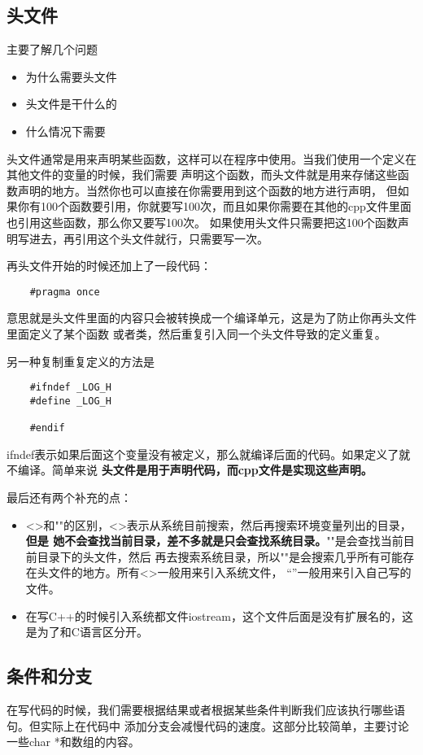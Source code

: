 \documentclass{article}
\begin{document}
\begin{sloppypar}
\subsection{头文件}
主要了解几个问题
\begin{itemize}
	\item 为什么需要头文件
	\item 头文件是干什么的
	\item 什么情况下需要
\end{itemize}

头文件通常是用来声明某些函数，这样可以在程序中使用。当我们使用一个定义在其他文件的变量的时候，我们需要
声明这个函数，而头文件就是用来存储这些函数声明的地方。当然你也可以直接在你需要用到这个函数的地方进行声明，
但如果你有100个函数要引用，你就要写100次，而且如果你需要在其他的cpp文件里面也引用这些函数，那么你又要写100次。
如果使用头文件只需要把这100个函数声明写进去，再引用这个头文件就行，只需要写一次。	

再头文件开始的时候还加上了一段代码：
\begin{lstlisting}
	#pragma once
\end{lstlisting}
意思就是头文件里面的内容只会被转换成一个编译单元，这是为了防止你再头文件里面定义了某个函数
或者类，然后重复引入同一个头文件导致的定义重复。	

另一种复制重复定义的方法是
\begin{lstlisting}
	#ifndef _LOG_H
	#define _LOG_H

	#endif
\end{lstlisting}
ifndef表示如果后面这个变量没有被定义，那么就编译后面的代码。如果定义了就不编译。简单来说
\textbf{头文件是用于声明代码，而cpp文件是实现这些声明。}

最后还有两个补充的点：
\begin{itemize}
	\item <>和""的区别，<>表示从系统目前搜索，然后再搜索环境变量列出的目录，\textbf{但是
	她不会查找当前目录，差不多就是只会查找系统目录。}""是会查找当前目前目录下的头文件，然后
	再去搜索系统目录，所以""是会搜索几乎所有可能存在头文件的地方。所有<>一般用来引入系统文件，
	“”一般用来引入自己写的文件。
	\item 在写C++的时候引入系统都文件iostream，这个文件后面是没有扩展名的，这是为了和C语言区分开。
\end{itemize}

\subsection{条件和分支}
 在写代码的时候，我们需要根据结果或者根据某些条件判断我们应该执行哪些语句。但实际上在代码中
 添加分支会减慢代码的速度。这部分比较简单，主要讨论一些char *和数组的内容。


\end{sloppypar}
\end{document}
